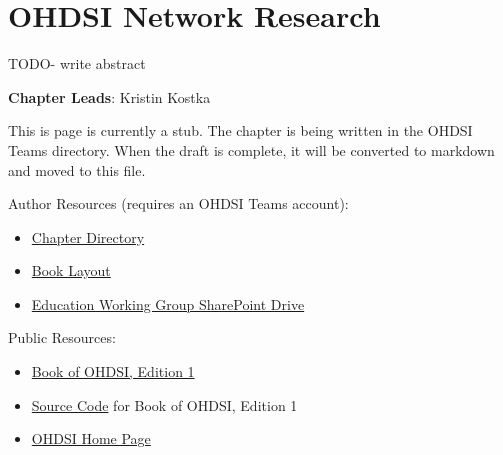 \documentclass[
  letterpaper,
  paper=7in:10in,
  pagesize=pdftex,
  headinclude=on,
  footinclude=on,
  12pt]{scrbook}
\providecommand{\tightlist}{%
  \setlength{\itemsep}{0pt}\setlength{\parskip}{0pt}}\usepackage{longtable,booktabs,array}
\begin{document}
\chapter{OHDSI Network Research}\label{sec-research-network}

TODO- write abstract

\hfill\break

\textbf{Chapter Leads}: Kristin Kostka

\begin{tcolorbox}[enhanced jigsaw, opacitybacktitle=0.6, coltitle=black, colback=white, bottomrule=.15mm, bottomtitle=1mm, title=\textcolor{quarto-callout-note-color}{\faInfo}\hspace{0.5em}{Note}, titlerule=0mm, rightrule=.15mm, colbacktitle=quarto-callout-note-color!10!white, colframe=quarto-callout-note-color-frame, toptitle=1mm, arc=.35mm, left=2mm, breakable, opacityback=0, leftrule=.75mm, toprule=.15mm]

This is page is currently a stub. The chapter is being written in the
OHDSI Teams directory. When the draft is complete, it will be converted
to markdown and moved to this file.

Author Resources (requires an OHDSI Teams account):

\begin{itemize}
\tightlist
\item
  \href{https://ohdsiorg.sharepoint.com/sites/Workgroup-EducationWorkingGroup/Shared\%20Documents/Forms/AllItems.aspx?id=\%2Fsites\%2FWorkgroup\%2DEducationWorkingGroup\%2FShared\%20Documents\%2FSection\%20V\%20\%2D\%20Studies\%2FChapter\%2021\%20OHDSI\%20Network\%20Research&viewid=05fec2cc\%2Dec8a\%2D4d04\%2Db565\%2Dcf1289b96f67}{Chapter
  Directory}
\item
  \href{https://ohdsiorg.sharepoint.com/:x:/r/sites/Workgroup-EducationWorkingGroup/_layouts/15/Doc2.aspx?action=edit&sourcedoc=\%7B1fa31e39-1c5f-4918-b878-609ebd9810b3\%7D&wdOrigin=TEAMS-WEB.teamsSdk_ns.rwc&wdExp=TEAMS-TREATMENT&wdhostclicktime=1748104477731&web=1}{Book
  Layout}
\item
  \href{https://ohdsiorg.sharepoint.com/sites/Workgroup-EducationWorkingGroup/Shared\%20Documents/Forms/AllItems.aspx?viewid=05fec2cc\%2Dec8a\%2D4d04\%2Db565\%2Dcf1289b96f67}{Education
  Working Group SharePoint Drive}
\end{itemize}

Public Resources:

\begin{itemize}
\tightlist
\item
  \href{https://ohdsi.github.io/TheBookOfOhdsi/}{Book of OHDSI, Edition
  1}
\item
  \href{https://github.com/OHDSI/TheBookOfOhdsi}{Source Code} for Book
  of OHDSI, Edition 1
\item
  \href{https://ohdsi.org/}{OHDSI Home Page}
\end{itemize}

\end{tcolorbox}
\end{document}
